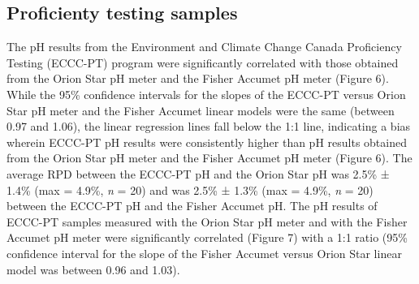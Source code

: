 \documentclass[
]{article}
\begin{document}
\subsection{Proficienty testing samples}

The pH results from the Environment and Climate Change Canada
Proficiency Testing (ECCC-PT) program were significantly correlated with
those obtained from the Orion Star pH meter and the Fisher Accumet pH
meter (Figure 6). While the 95\% confidence intervals for the slopes of
the ECCC-PT versus Orion Star pH meter and the Fisher Accumet linear
models were the same (between 0.97 and 1.06), the linear regression
lines fall below the 1:1 line, indicating a bias wherein ECCC-PT pH
results were consistently higher than pH results obtained from the Orion
Star pH meter and the Fisher Accumet pH meter (Figure 6). The average
RPD between the ECCC-PT pH and the Orion Star pH was 2.5\% ± 1.4\% (max
= 4.9\%, \emph{n} = 20) and was 2.5\% ± 1.3\% (max = 4.9\%, \emph{n} =
20) between the ECCC-PT pH and the Fisher Accumet pH. The pH results of
ECCC-PT samples measured with the Orion Star pH meter and with the
Fisher Accumet pH meter were significantly correlated (Figure 7) with a
1:1 ratio (95\% confidence interval for the slope of the Fisher Accumet
versus Orion Star linear model was between 0.96 and 1.03).
\end{document}
